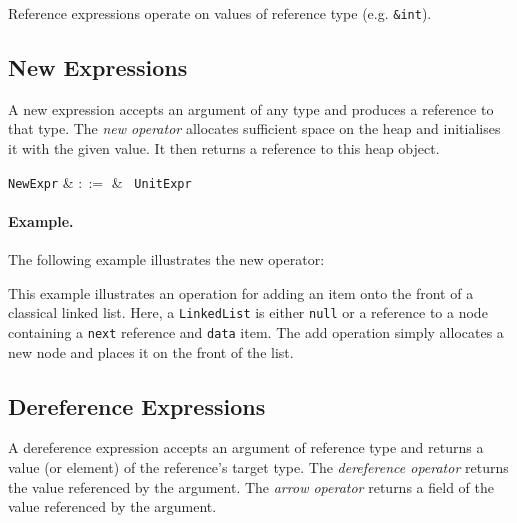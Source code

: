 Reference expressions operate on values of reference type (e.g. \lstinline{&int}).


\subsection{New Expressions}
\label{c_expr_new}

A new expression accepts an argument of any type and produces a reference to that type.  The {\em new operator} allocates sufficient space on the heap and initialises it with the given value.  It then returns a reference to this heap object.

\begin{syntax}
\verb+NewExpr+ & $::=$ & \ \verb+UnitExpr+\\
\end{syntax}

\paragraph{Example.} The following example illustrates the new operator:



This example illustrates an operation for adding an item onto the front of a classical linked list.  Here, a \lstinline{LinkedList} is either \lstinline{null} or a reference to a node containing a \lstinline{next} reference and \lstinline{data} item.  The add operation simply allocates a new node and places it on the front of the list.


\subsection{Dereference Expressions}
\label{c_expr_dereference}

A dereference expression accepts an argument of reference type and returns a value (or element) of the reference's target type.  The {\em dereference operator} returns the value referenced by the argument.  The {\em arrow operator} returns a field of the value referenced by the argument.

